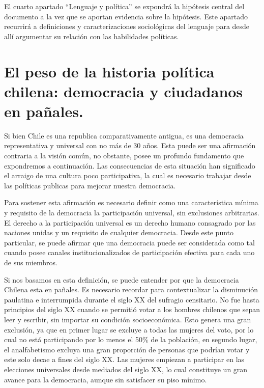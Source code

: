 \documentclass[12pt,twoside]{templates/facsothesis}
\begin{document}
El cuarto apartado ``Lenguaje y política'' se expondrá la hipótesis central del documento a la vez que se aportan evidencia sobre la hipótesis. Este apartado recurrirá a definiciones y caracterizaciones sociológicas del lenguaje para desde allí argumentar su relación con las habilidades políticas.

\hypertarget{el-peso-de-la-historia-poluxedtica-chilena-democracia-y-ciudadanos-en-pauxf1ales.}{%
\section{El peso de la historia política chilena: democracia y ciudadanos en pañales.}\label{el-peso-de-la-historia-poluxedtica-chilena-democracia-y-ciudadanos-en-pauxf1ales.}}

Si bien Chile es una republica comparativamente antigua, es una democracia representativa y universal con no más de 30 años. Esta puede ser una afirmación contraria a la visión común, no obstante, posee un profundo fundamento que expondremos a continuación. Las consecuencias de esta situación han significado el arraigo de una cultura poco participativa, la cual es necesario trabajar desde las políticas publicas para mejorar nuestra democracia.

Para sostener esta afirmación es necesario definir como una característica mínima y requisito de la democracia la participación universal, sin exclusiones arbitrarias. El derecho a la participación universal es un derecho humano consagrado por las naciones unidas y un requisito de cualquier democracia. Desde este punto particular, se puede afirmar que una democracia puede ser considerada como tal cuando posee canales institucionalizados de participación efectiva para cada uno de sus miembros.

Si nos basamos en esta definición, se puede entender por que la democracia Chilena esta en pañales. Es necesario recordar para contextualizar la disminución paulatina e interrumpida durante el siglo XX del sufragio censitario. No fue hasta principios del siglo XX cuando se permitió votar a los hombres chilenos que sepan leer y escribir, sin importar su condición socioeconómica. Esto genera una gran exclusión, ya que en primer lugar se excluye a todas las mujeres del voto, por lo cual no está participando por lo menos el 50\% de la población, en segundo lugar, el analfabetismo excluya una gran proporción de personas que podrían votar y este solo decae a fines del siglo XX. Las mujeres empiezan a participar en las elecciones universales desde mediados del siglo XX, lo cual constituye un gran avance para la democracia, aunque sin satisfacer su piso mínimo.
\end{document}
